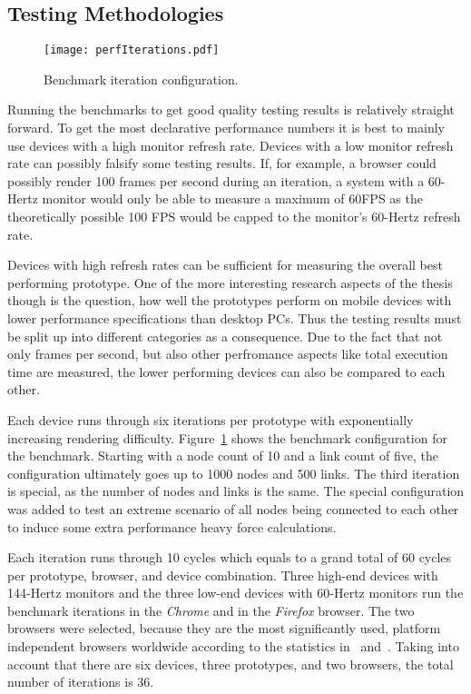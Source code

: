 \subsection{Testing Methodologies}

\begin{figure}
\centering
\texttt{[image: perfIterations.pdf]}
\caption{Benchmark iteration configuration.}
\label{fig:perfIterations}
\end{figure}

Running the benchmarks to get good quality testing results is relatively straight forward. To get the most declarative performance numbers it is best to mainly use devices with a high monitor refresh rate. Devices with a low monitor refresh rate can possibly falsify some testing results. If, for example, a browser could possibly render 100 frames per second during an iteration, a system with a 60-Hertz monitor would only be able to measure a maximum of 60FPS as the theoretically possible 100 FPS would be capped to the monitor's 60-Hertz refresh rate.

Devices with high refresh rates can be sufficient for measuring the overall best performing prototype. One of the more interesting research aspects of the thesis though is the question, how well the prototypes perform on mobile devices with lower performance specifications than desktop PCs. Thus the testing results must be split up into different categories as a consequence. Due to the fact that not only frames per second, but also other perfromance aspects like total execution time are measured, the lower performing devices can also be compared to each other.

Each device runs through six iterations per prototype with exponentially increasing rendering difficulty. Figure~\ref{fig:perfIterations} shows the benchmark configuration for the benchmark. Starting with a node count of 10 and a link count of five, the configuration ultimately goes up to 1000 nodes and 500 links. The third iteration is special, as the number of nodes and links is the same. The special configuration was added to test an extreme scenario of all nodes being connected to each other to induce some extra performance heavy force calculations.

Each iteration runs through 10 cycles which equals to a grand total of 60 cycles per prototype, browser, and device combination. Three high-end devices with 144-Hertz monitors and the three low-end devices with 60-Hertz monitors run the benchmark iterations in the \emph{Chrome} and in the \emph{Firefox} browser. The two browsers were selected, because they are the most sig\-nifi\-cantly used, platform independent browsers worldwide according to the statistics in~\cite{StatCounterBrowserMarketShare} and~\cite{W3CBrowserMarketShare}. Taking into account that there are six devices, three prototypes, and two browsers, the total number of iterations is 36.

